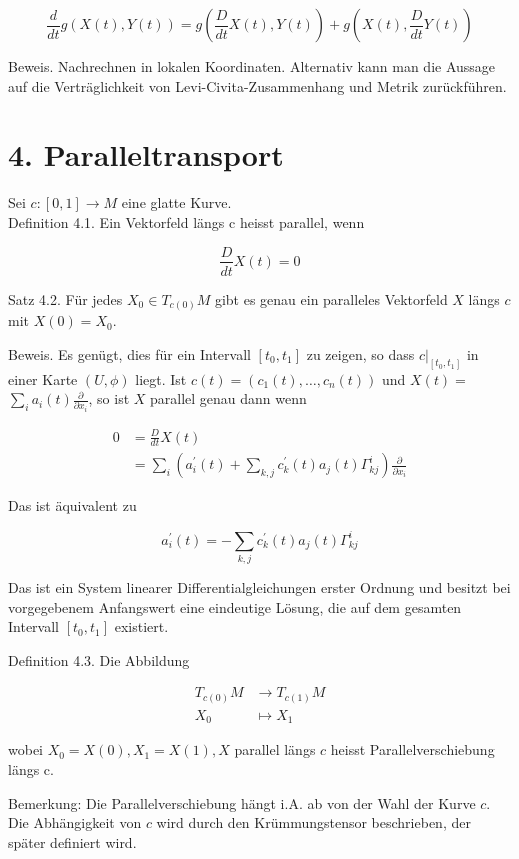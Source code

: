 \documentclass[10pt, letterpaper]{article}
\begin{document}
$$
\frac{d}{d t} g(X(t), Y(t))=g\left(\frac{D}{d t} X(t), Y(t)\right)+g\left(X(t), \frac{D}{d t} Y(t)\right)
$$

Beweis. Nachrechnen in lokalen Koordinaten. Alternativ kann man die Aussage auf die Verträglichkeit von Levi-Civita-Zusammenhang und Metrik zurückführen.

\section*{4. Paralleltransport}
Sei $c:[0,1] \rightarrow M$ eine glatte Kurve.\\
Definition 4.1. Ein Vektorfeld längs c heisst parallel, wenn

$$
\frac{D}{d t} X(t)=0
$$

Satz 4.2. Für jedes $X_{0} \in T_{c(0)} M$ gibt es genau ein paralleles Vektorfeld $X$ längs $c$ mit $X(0)=X_{0}$.

Beweis. Es genügt, dies für ein Intervall $\left[t_{0}, t_{1}\right]$ zu zeigen, so dass $\left.c\right|_{\left[t_{0}, t_{1}\right]}$ in einer Karte $(U, \phi)$ liegt. Ist $c(t)=\left(c_{1}(t), \ldots, c_{n}(t)\right)$ und $X(t)=$ $\sum_{i} a_{i}(t) \frac{\partial}{\partial x_{i}}$, so ist $X$ parallel genau dann wenn

$$
\begin{aligned}
0 & =\frac{D}{d t} X(t) \\
& =\sum_{i}\left(a_{i}^{\prime}(t)+\sum_{k, j} c_{k}^{\prime}(t) a_{j}(t) \Gamma_{k j}^{i}\right) \frac{\partial}{\partial x_{i}}
\end{aligned}
$$

Das ist äquivalent zu

$$
a_{i}^{\prime}(t)=-\sum_{k, j} c_{k}^{\prime}(t) a_{j}(t) \Gamma_{k j}^{i}
$$

Das ist ein System linearer Differentialgleichungen erster Ordnung und besitzt bei vorgegebenem Anfangswert eine eindeutige Lösung, die auf dem gesamten Intervall $\left[t_{0}, t_{1}\right]$ existiert.

Definition 4.3. Die Abbildung

$$
\begin{aligned}
T_{c(0)} M & \rightarrow T_{c(1)} M \\
X_{0} & \mapsto X_{1}
\end{aligned}
$$

wobei $X_{0}=X(0), X_{1}=X(1), X$ parallel längs $c$ heisst Parallelverschiebung längs c.

Bemerkung: Die Parallelverschiebung hängt i.A. ab von der Wahl der Kurve $c$. Die Abhängigkeit von $c$ wird durch den Krümmungstensor beschrieben, der später definiert wird.
\end{document}
